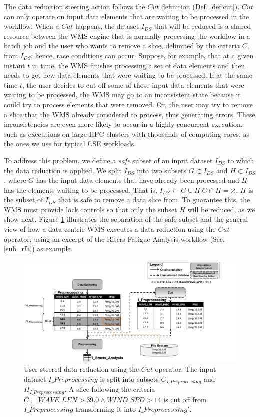 The data reduction steering action follows the $Cut$ definition (Def. \ref{def:cut}).
$Cut$ can only operate on input data elements that are waiting
to be processed in the workflow. When a $Cut$ happens, the
dataset $I_{DS}$ that will be reduced is a shared resource between the
WMS engine that is normally processing the workflow in a batch job and
the user who wants to remove a slice, delimited by the criteria $C$, from $I_{DS}$; hence, race
conditions can occur. Suppose, for example, that at a given instant
$t$ in time, the WMS finishes processing a set of data elements
and then needs to get new data elements that were waiting to be
processed. If at the same time $t$, the user decides to cut off some
of those input data elements that were waiting to be processed, the WMS
may go to an inconsistent state because it could try to process elements
that were removed. Or, the user may try to remove a slice that the WMS
already considered to process, thus generating errors. These
inconsistencies are even more likely to occur in a highly concurrent
execution, such as executions on large HPC clusters with thousands of
computing cores, as the ones we use for typical CSE workloads.

To address this problem, we define a \emph{safe} subset of an input
dataset $I_{DS}$ to which the data reduction is applied. We split $I_{DS}$ into
two subsets $G \subset I_{DS}$ and $H \subset I_{DS}$, where $G$ has the input data elements that have already been processed and
$H$ has the elements waiting to be
processed. That is,
$I_{DS} \leftarrow G \cup H |  G \cap H =  \varnothing$.
$H$ is the subset of $I_{DS}$ that is safe to remove a data slice
from. To guarantee this, the WMS must provide lock controls so that
only the subset $H$ will be reduced, as we show next.
Figure \ref{fig:cut_rfa} illustrates the separation of the safe subset and the general view of how a data-centric WMS executes a data reduction using the $Cut$ operator, using an excerpt of the Risers Fatigue Analysis workflow (Sec. \ref{sub_rfa}) as example.

\begin{figure}[H]
    \centering
    \includegraphics[width=\textwidth,keepaspectratio]{img/rfa_cut_example.pdf}
    \caption{User-steered data reduction using the $Cut$ operator. The input dataset  $I\_Preprocessing$ is split into subsets $G_{I\_Preprocessing}$ and $H_{I\_Preprocessing}$. 
    A slice following the criteria $C = WAVE\_LEN > 39.0 \wedge WIND\_SPD > 14$ is cut off from $I\_Preprocessing$ transforming it into $I\_Preprocessing'$.}
    \label{fig:cut_rfa}
\end{figure}


